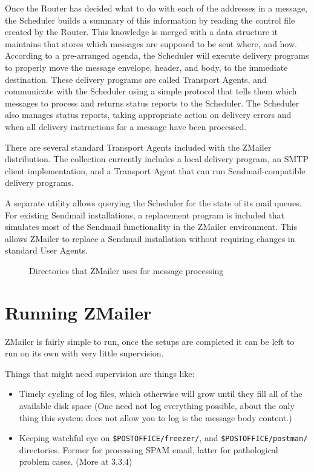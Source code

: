 
Once the Router has decided what to do with each of the addresses in a
message, the Scheduler builds a summary of this information by reading the
control file created by the Router.  This knowledge is merged with a data
structure it maintains that stores which messages are supposed to be sent
where, and how.  According to a pre-arranged agenda, the Scheduler will
execute delivery programs to properly move the message envelope, header,
and body, to the immediate destination.  These delivery programs are called
Transport Agents, and communicate with the Scheduler using a simple
protocol that tells them which messages to process and returns status
reports to the Scheduler.  The Scheduler also manages status reports,
taking appropriate action on delivery errors and when all delivery
instructions for a message have been processed.

There are several standard Transport Agents included with the ZMailer
distribution.  The collection currently includes a local delivery program,
an SMTP client implementation, and a Transport Agent that can run
Sendmail-compatible delivery programs.

A separate utility allows querying the Scheduler for the state of its mail
queues.  For existing Sendmail installations, a replacement program is
included that simulates most of the Sendmail functionality in the ZMailer
environment.  This allows ZMailer to replace a Sendmail installation
without requiring changes in standard User Agents.


\begin{figure}[ht]
  \centering
  \caption{\label{fig:zmdirs}Directories that ZMailer uses for message processing}
\end{figure}


\section{Running ZMailer}

ZMailer is fairly simple to run, once the setups are completed
it can be left to run on its own with very little supervision.

Things that might need supervision are things like:
\begin{itemize}
\item Timely cycling of log files, which otherwise will grow until
they fill all of the available disk space  (One need not log
everything possible, about the only thing this system does not
allow you to log is the message body content.)
\item Keeping watchful eye on  {\tt \$POSTOFFICE/freezer/}, and 
{\tt \$POSTOFFICE/postman/}
directories.  Former for processing SPAM email, latter for
pathological problem cases.  (More at  3.3.4)
\end{itemize}

